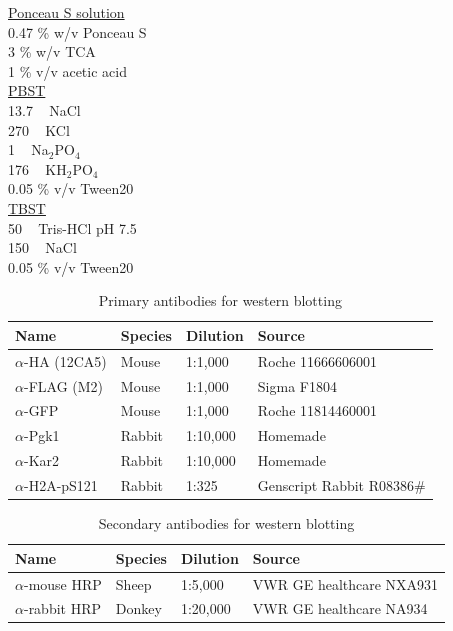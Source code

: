 \underline{Ponceau S solution}\\
0.47 \% w/v Ponceau S \\
3 \% w/v TCA \\
1 \% v/v acetic acid \\

\underline{PBST}\\
13.7 \si{\milli\Molar} NaCl\\
270 \si{\micro\Molar} KCl\\
1 \si{\milli\Molar} Na$_{2}$PO$_{4}$\\
176 \si{\micro\Molar} KH$_{2}$PO$_{4}$\\
0.05 \% v/v Tween20\\

\underline{TBST}\\
50 \si{\milli\Molar} Tris-HCl pH 7.5\\
150 \si{\milli\Molar} NaCl\\
0.05 \% v/v Tween20\\

\begin{table}[htbp]
\centering
\caption{Primary antibodies for western blotting}
\label{tab:1stab}
\begin{tabular}{llll}
\hline
\textbf{Name} & \textbf{Species} & \textbf{Dilution} & \textbf{Source} \\ \hline
$\alpha$-HA (12CA5) & Mouse & 1:1,000 & Roche 11666606001 \\   
$\alpha$-FLAG (M2) & Mouse & 1:1,000 & Sigma F1804 \\   
$\alpha$-GFP & Mouse & 1:1,000 & Roche 11814460001 \\
$\alpha$-Pgk1 & Rabbit & 1:10,000 & Homemade \\
$\alpha$-Kar2 & Rabbit & 1:10,000 & Homemade \\
$\alpha$-H2A-pS121 & Rabbit & 1:325 & Genscript Rabbit R08386\# \\
\end{tabular}
\end{table}

\begin{table}[htbp]
\centering
\caption{Secondary antibodies for western blotting}
\label{tab:2ndab}
\begin{tabular}{llll}
\hline
\textbf{Name} & \textbf{Species} & \textbf{Dilution} & \textbf{Source} \\ \hline
$\alpha$-mouse HRP & Sheep & 1:5,000 & VWR GE healthcare NXA931 \\   
$\alpha$-rabbit HRP & Donkey & 1:20,000 & VWR GE healthcare NA934 \\   
\end{tabular}
\end{table}

